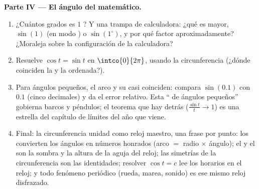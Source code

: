 \begin{problem}
\medskip
\noindent\textbf{Parte IV --- El ángulo del matemático.}
\begin{enumerate}[resume]
  \item ¿Cuántos grados es $1$ ? Y una trampa de calculadora: ¿qué
        es mayor, $\sin(1)$ (en modo ) o $\sin(1^\circ)$, y por
        qué factor aproximadamente? ¿Moraleja sobre la configuración de la
        calculadora?
  \item Resuelve $\cos t = \sin t$ en $\intco{0}{2\pi}$, usando la
        circunferencia (¿dónde coinciden la  y la ordenada?).
  \item Para ángulos pequeños, el arco y su  casi coinciden: compara
        $\sin(0.1)$ con $0.1$ (cinco decimales) y da el error relativo.
        Esta `` de ángulos pequeños'' gobierna barcos y
        péndulos; el teorema que hay detrás ($\frac{\sin t}{t} \to 1$) es
        una estrella del capítulo de límites del año que viene.
  \item Final: la circunferencia unidad como reloj maestro, una frase por
        punto: los  convierten los ángulos en números honrados
        (arco $=$ radio $\times$ ángulo); el  y el  son la
        sombra y la altura de la aguja del reloj; las simetrías de la
        circunferencia son las identidades; resolver $\cos t = c$ lee los
        horarios en el reloj; y todo fenómeno periódico (rueda, marea,
        sonido) es ese mismo reloj disfrazado.
\end{enumerate}
\end{problem}
